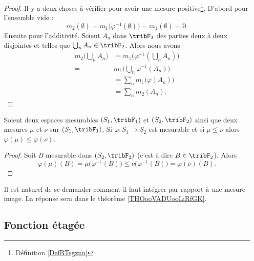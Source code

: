 \begin{proof}
    Il y a deux choses à vérifier pour avoir une mesure positive\footnote{Définition \ref{DefBTsgznn}}. D'abord pour l'ensemble vide :
    \begin{equation}
        m_2(\emptyset)=m_1\big( \varphi^{-1}(\emptyset) \big)=m_1(\emptyset)=0.
    \end{equation}
    Ensuite pour l'additivité. Soient \( A_n\) dans \( \tribF_2\) des parties deux à deux disjointes et telles que \( \bigcup_nA_n\in\tribF_2\). Alors nous avons
    \begin{subequations}
        \begin{align}
            m_2\big( \bigcup_nA_n \big)&=m_1\Big( \varphi^{-1}(\bigcup_nA_n) \Big)\\
            =&m_1\big( \bigcup_n\varphi^{-1}(A_n) \big)\\
            &=\sum_nm_1\big( \varphi(A_n) \big)\\
            &=\sum_nm_2(A_n).
        \end{align}
    \end{subequations}
\end{proof}

\begin{lemma}
    Soient deux espaces mesurables \( (S_1,\tribF_1)\) et \( (S_2,\tribF_2)\) ainsi que deux mesures \( \mu\) et \( \nu\) sur \( (S_1,\tribF_1)\). Si \( \varphi\colon S_1\to S_2\) est mesurable et si \( \mu\leq \nu\) alors \( \varphi(\mu)\leq \varphi(\nu)\).
\end{lemma}

\begin{proof}
    Soit \( B\) mesurable dans \( (S_2,\tribF_2)\) (c'est à dire \( B\in \tribF_2\)). Alors
    \begin{equation}
        \varphi(\mu)(B)=\mu\big( \varphi^{-1}(B) \big)\leq\nu\big( \varphi^{-1}(B) \big)=\varphi(\nu)(B).
    \end{equation}
\end{proof}

Il est naturel de se demander comment il faut intégrer par rapport à une mesure image. La réponse sera dans le théorème \ref{THOooVADUooLiRfGK}.

\subsection{Fonction étagée}

